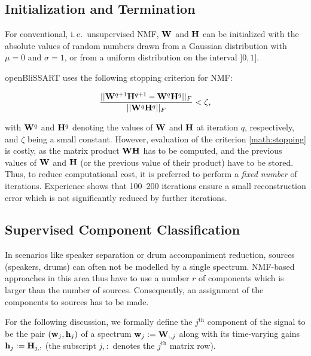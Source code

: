 \subsection{Initialization and Termination}

For conventional, i.\,e.\ unsupervised NMF, $\mathbf{W}$ and $\mathbf{H}$ can be initialized with the absolute values of random numbers drawn from a
Gaussian distribution with $\mu = 0$ and $\sigma = 1$, or from a uniform distribution on the interval $]0,1]$. 

openBliSSART uses the following stopping criterion for NMF:

\begin{equation}
    \label{math:stopping}
    \frac{||\mathbf{W}^{q+1}\mathbf{H}^{q+1} - \mathbf{W}^{q}\mathbf{H}^{q}||_F}
         {||\mathbf{W}^{q}\mathbf{H}^{q}||_F}
    < \zeta ,
\end{equation}

\noindent with $\mathbf{W}^q$ and $\mathbf{H}^q$ denoting the values of $\mathbf{W}$ and
$\mathbf{H}$ at iteration $q$, respectively, and $\zeta$ being a small constant.
However, evaluation of the criterion \ref{math:stopping} is costly, as the
matrix product $\mathbf{WH}$ has to be computed, and the previous values of
$\mathbf{W}$ and $\mathbf{H}$ (or the previous value of their product) have to be
stored. Thus, to reduce computational cost, it is preferred to perform a \emph{fixed
number} of iterations. Experience shows that 100--200 iterations ensure a small
reconstruction error which is not significantly reduced by further iterations.


\subsection{Supervised Component Classification}

\label{sec:nmfbss}

In scenarios like speaker separation or drum accompaniment reduction, sources
(speakers, drums) can often not be modelled by a single spectrum. NMF-based
approaches in this area thus have to use a number $r$ of components which is
larger than the number of sources. Consequently, an assignment of the
components to sources has to be made.

For the following discussion, we formally define the $j^{\textrm{th}}$
component of the signal to be the pair $\left(\mathbf{w}_j, \mathbf{h}_j\right)$ of a
spectrum $\mathbf{w}_j := \mathbf{W}_{:,j}$ along with its time-varying gains
$\mathbf{h}_j := \mathbf{H}_{j,:}$ (the subscript $j,:$ denotes the $j^{\textrm{th}}$
matrix row).

